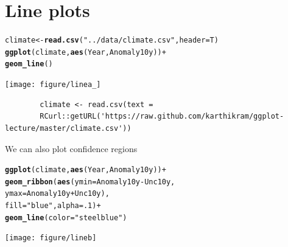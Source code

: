 \documentclass{beamer}\usepackage[]{graphicx}\usepackage[]{color}
\makeatletter
\newcommand{\hlnum}[1]{\textcolor[rgb]{0.686,0.059,0.569}{#1}}%
\newcommand{\hlstr}[1]{\textcolor[rgb]{0.192,0.494,0.8}{#1}}%
\newcommand{\hlopt}[1]{\textcolor[rgb]{0,0,0}{#1}}%
\newcommand{\hlstd}[1]{\textcolor[rgb]{0.345,0.345,0.345}{#1}}%
\newcommand{\hlkwb}[1]{\textcolor[rgb]{0.69,0.353,0.396}{#1}}%
\newcommand{\hlkwc}[1]{\textcolor[rgb]{0.333,0.667,0.333}{#1}}%
\newcommand{\hlkwd}[1]{\textcolor[rgb]{0.737,0.353,0.396}{\textbf{#1}}}%
\newenvironment{kframe}{%
 \def\at@end@of@kframe{}%
 \ifinner\ifhmode%
  \def\at@end@of@kframe{\end{minipage}}%
  \begin{minipage}{\columnwidth}%
 \fi\fi%
 \def\FrameCommand##1{\hskip\@totalleftmargin \hskip-\fboxsep
 \colorbox{shadecolor}{##1}\hskip-\fboxsep
     \hskip-\linewidth \hskip-\@totalleftmargin \hskip\columnwidth}%
 \MakeFramed {\advance\hsize-\width
   \@totalleftmargin\z@ \linewidth\hsize
   \@setminipage}}%
 {\par\unskip\endMakeFramed%
 \at@end@of@kframe}
\newenvironment{knitrout}{}{} %
\makeatother
\begin{document}

\section*{Line plots}
\frame{\sectionpage}


\begin{frame}[fragile]
\begin{knitrout}\footnotesize
{}\color{fgcolor}\begin{kframe}
\begin{alltt}
\hlstd{climate} \hlkwb{<-} \hlkwd{read.csv}\hlstd{(}\hlstr{"../data/climate.csv"}\hlstd{,} \hlkwc{header} \hlstd{= T)}
\hlkwd{ggplot}\hlstd{(climate,} \hlkwd{aes}\hlstd{(Year, Anomaly10y))} \hlopt{+}
\hlkwd{geom_line}\hlstd{()}
\end{alltt}
\end{kframe}

{\centering \texttt{[image: figure/linea\_]} 

}



\end{knitrout}
\begin{flushright}
\begingroup
    \fontsize{6pt}{12pt}\selectfont
    \begin{verbatim}
        climate <- read.csv(text =
        RCurl::getURL('https://raw.github.com/karthikram/ggplot-lecture/master/climate.csv'))
    \end{verbatim}
\endgroup
\end{flushright}
\end{frame}


\begin{frame}[fragile]
We can also plot confidence regions
\begin{knitrout}\footnotesize
{}\color{fgcolor}\begin{kframe}
\begin{alltt}
\hlkwd{ggplot}\hlstd{(climate,} \hlkwd{aes}\hlstd{(Year, Anomaly10y))} \hlopt{+}
\hlkwd{geom_ribbon}\hlstd{(}\hlkwd{aes}\hlstd{(}\hlkwc{ymin} \hlstd{= Anomaly10y} \hlopt{-} \hlstd{Unc10y,}
\hlkwc{ymax} \hlstd{= Anomaly10y} \hlopt{+} \hlstd{Unc10y),}
\hlkwc{fill} \hlstd{=} \hlstr{"blue"}\hlstd{,} \hlkwc{alpha} \hlstd{=} \hlnum{.1}\hlstd{)} \hlopt{+}
\hlkwd{geom_line}\hlstd{(}\hlkwc{color} \hlstd{=} \hlstr{"steelblue"}\hlstd{)}
\end{alltt}
\end{kframe}

{\centering \texttt{[image: figure/lineb]} 

}



\end{knitrout}
\end{frame}
\end{document}
